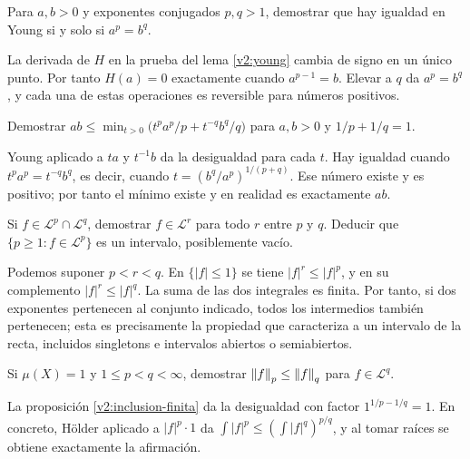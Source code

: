 \begin{ejercicio}\label{ej:v2-l18-1}
Para $a,b>0$ y exponentes conjugados $p,q>1$, demostrar que hay igualdad en Young si y solo si $a^p=b^q$.
\end{ejercicio}
\begin{solucion}
La derivada de $H$ en la prueba del lema \ref{v2:young} cambia de signo en un único punto. Por tanto $H(a)=0$ exactamente cuando $a^{p-1}=b$. Elevar a $q$ da $a^p=b^q$, y cada una de estas operaciones es reversible para números positivos.
\end{solucion}

\begin{ejercicio}\label{ej:v2-l18-2}
Demostrar $ab\le\min_{t>0}\bigl(t^pa^p/p+t^{-q}b^q/q\bigr)$ para $a,b>0$ y $1/p+1/q=1$.
\end{ejercicio}
\begin{solucion}
Young aplicado a $ta$ y $t^{-1}b$ da la desigualdad para cada $t$. Hay igualdad cuando $t^pa^p=t^{-q}b^q$, es decir, cuando $t=(b^q/a^p)^{1/(p+q)}$. Ese número existe y es positivo; por tanto el mínimo existe y en realidad es exactamente $ab$.
\end{solucion}

\begin{ejercicio}\label{ej:v2-l18-3}
Si $f\in\mathcal L^p\cap\mathcal L^q$, demostrar $f\in\mathcal L^r$ para todo $r$ entre $p$ y $q$. Deducir que $\{p\ge1:f\in\mathcal L^p\}$ es un intervalo, posiblemente vacío.
\end{ejercicio}
\begin{solucion}
Podemos suponer $p<r<q$. En $\{|f|\le1\}$ se tiene $|f|^r\le|f|^p$, y en su complemento $|f|^r\le|f|^q$. La suma de las dos integrales es finita. Por tanto, si dos exponentes pertenecen al conjunto indicado, todos los intermedios también pertenecen; esta es precisamente la propiedad que caracteriza a un intervalo de la recta, incluidos singletons e intervalos abiertos o semiabiertos.
\end{solucion}

\begin{ejercicio}\label{ej:v2-l18-4}
Si $\mu(X)=1$ y $1\le p<q<\infty$, demostrar $\left\lVert f\right\rVert_p\le\left\lVert f\right\rVert_q$ para $f\in\mathcal L^q$.
\end{ejercicio}
\begin{solucion}
La proposición \ref{v2:inclusion-finita} da la desigualdad con factor $1^{1/p-1/q}=1$. En concreto, Hölder aplicado a $|f|^p\cdot1$ da $\int|f|^p\le(\int|f|^q)^{p/q}$, y al tomar raíces se obtiene exactamente la afirmación.
\end{solucion}

